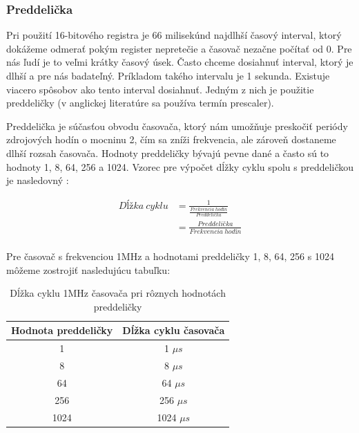 \subsubsection{Preddelička}
\noindent \par
Pri použití 16-bitového registra je 66 milisekúnd najdlhší časový interval, ktorý dokážeme odmerať pokým register nepretečie a časovač nezačne počítať od 0.
Pre nás ľudí je to veľmi krátky časový úsek. Často chceme dosiahnuť interval, ktorý je dlhší a pre nás badateľný. Príkladom takého intervalu je 1 sekunda.
Existuje viacero spôsobov ako tento interval dosiahnuť. Jedným z nich je použitie preddeličky (v anglickej literatúre sa používa termín prescaler).
\par
Preddelička je súčasťou obvodu časovača, ktorý nám umožňuje preskočiť periódy zdrojových hodín o mocninu 2, čím sa zníži frekvencia,
ale zároveň dostaneme dlhší rozsah časovača.
Hodnoty preddeličky bývajú pevne dané a často sú to hodnoty 1, 8, 64, 256 a 1024. Vzorec pre výpočet dĺžky cyklu spolu s preddeličkou je nasledovný \cite{atmelATmega64012801281}:

\begin{equation} \label{eq:cycle-length}
    \begin{aligned}
        Dĺžka\:cyklu & = \frac{1}{\frac{Frekvencia\:hodín}{Preddelička}} \\
                     & = \frac{Preddelička}{Frekvencia\:hodín}           \\
    \end{aligned}
\end{equation}

Pre časovač s frekvenciou 1MHz a hodnotami preddeličky 1, 8, 64, 256 s 1024 môžeme zostrojiť nasledujúcu tabuľku:
\begin{table}[!htbp]
    \begin{center}
        \begin{tabular}{|c|c|}
            \hline
            Hodnota preddeličky & Dĺžka cyklu časovača \\
            \hline
            1                   & 1 $\mu s$            \\
            8                   & 8 $\mu s$            \\
            64                  & 64 $\mu s$           \\
            256                 & 256 $\mu s$          \\
            1024                & 1024 $\mu s$         \\
            \hline
        \end{tabular}
        \caption{Dĺžka cyklu 1MHz časovača pri rôznych hodnotách preddeličky}
        \label{table:timerPrescaler}
    \end{center}
\end{table}


